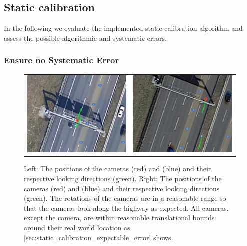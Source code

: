 
\subsection{Static calibration}
In the following we evaluate the implemented static calibration algorithm and assess the possible algorithmic and systematic errors.


\subsubsection{Ensure no Systematic Error}

\begin{figure}[t]
    \centering
    \begin{tabular}{cc}
      \includegraphics[width=0.45 \linewidth]{images/calibration/google_maps_s40_n.png} &
      \includegraphics[width=0.45 \linewidth]{images/calibration/google_maps_s50_s.png} 
  \end{tabular}
  \caption{Left: The positions of the cameras  (red) and  (blue) and their respective looking directions (green). 
  Right: The positions of the cameras  (red) and  (blue) and their respective looking directions (green). 
  The rotations of the cameras are in a reasonable range so that the cameras look along the highway as expected. 
  All cameras, except the  camera, are within reasonable translational bounds around their real world location as \autoref{sec:static_calibration_expectable_error} shows.
  }
  \label{fig:static_calibration_google_maps}
  \end{figure}

